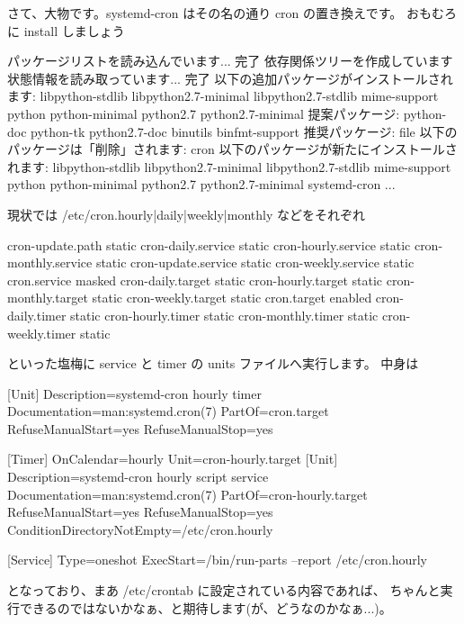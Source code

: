\documentclass[mingoth,a4paper]{jsarticle}
\begin{document}
さて、大物です。systemd-cron はその名の通り cron の置き換えです。
おもむろに install しましょう
\begin{commandline}
パッケージリストを読み込んでいます... 完了
依存関係ツリーを作成しています
状態情報を読み取っています... 完了
以下の追加パッケージがインストールされます:
  libpython-stdlib libpython2.7-minimal libpython2.7-stdlib mime-support python python-minimal
  python2.7 python2.7-minimal
提案パッケージ:
  python-doc python-tk python2.7-doc binutils binfmt-support
推奨パッケージ:
  file
以下のパッケージは「削除」されます:
  cron
以下のパッケージが新たにインストールされます:
  libpython-stdlib libpython2.7-minimal libpython2.7-stdlib mime-support python python-minimal
  python2.7 python2.7-minimal systemd-cron
...
\end{commandline}
\noindent
現状では /etc/cron.{hourly|daily|weekly|monthly} などをそれぞれ
\begin{commandline}
cron-update.path                       static
cron-daily.service                     static
cron-hourly.service                    static
cron-monthly.service                   static
cron-update.service                    static
cron-weekly.service                    static
cron.service                           masked
cron-daily.target                      static
cron-hourly.target                     static
cron-monthly.target                    static
cron-weekly.target                     static
cron.target                            enabled
cron-daily.timer                       static
cron-hourly.timer                      static
cron-monthly.timer                     static
cron-weekly.timer                      static
\end{commandline}
\noindent
といった塩梅に service と timer の units ファイルへ実行します。
中身は
\begin{commandline}
[Unit]
Description=systemd-cron hourly timer
Documentation=man:systemd.cron(7)
PartOf=cron.target
RefuseManualStart=yes
RefuseManualStop=yes

[Timer]
OnCalendar=hourly
Unit=cron-hourly.target
[Unit]
Description=systemd-cron hourly script service
Documentation=man:systemd.cron(7)
PartOf=cron-hourly.target
RefuseManualStart=yes
RefuseManualStop=yes
ConditionDirectoryNotEmpty=/etc/cron.hourly

[Service]
Type=oneshot
ExecStart=/bin/run-parts --report /etc/cron.hourly
\end{commandline}
\noindent
となっており、まあ /etc/crontab に設定されている内容であれば、
ちゃんと実行できるのではないかなぁ、と期待します(が、どうなのかなぁ...)。
\end{document}
